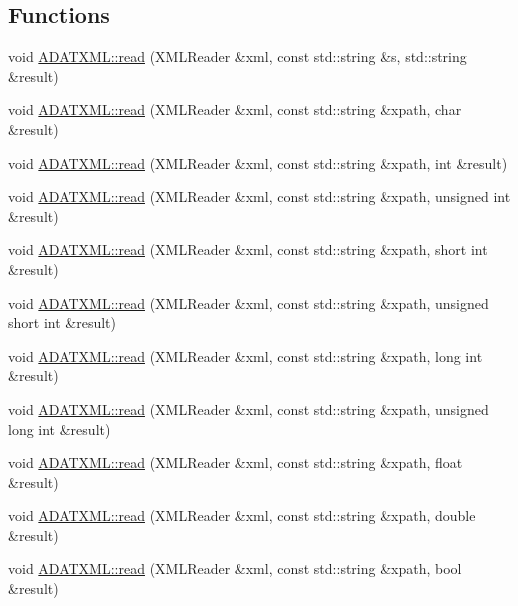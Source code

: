 \subsection*{Functions}
\begin{DoxyCompactItemize}
\item 
void \mbox{\hyperlink{group__io_ga9ad99522897be390bf165bf7f963acc8}{A\+D\+A\+T\+X\+M\+L\+::read}} (X\+M\+L\+Reader \&xml, const std\+::string \&s, std\+::string \&result)
\item 
void \mbox{\hyperlink{group__io_ga42921d40fdc242e0dc6200a66c1eb928}{A\+D\+A\+T\+X\+M\+L\+::read}} (X\+M\+L\+Reader \&xml, const std\+::string \&xpath, char \&result)
\item 
void \mbox{\hyperlink{group__io_ga0e33dbc1e3ebc33bfb45ef5f1b390e45}{A\+D\+A\+T\+X\+M\+L\+::read}} (X\+M\+L\+Reader \&xml, const std\+::string \&xpath, int \&result)
\item 
void \mbox{\hyperlink{group__io_ga8237b5b121cf20d4d72ebe0396ad5fc7}{A\+D\+A\+T\+X\+M\+L\+::read}} (X\+M\+L\+Reader \&xml, const std\+::string \&xpath, unsigned int \&result)
\item 
void \mbox{\hyperlink{group__io_gac393d0005e4174339c4abaf8a008deac}{A\+D\+A\+T\+X\+M\+L\+::read}} (X\+M\+L\+Reader \&xml, const std\+::string \&xpath, short int \&result)
\item 
void \mbox{\hyperlink{group__io_ga8fe4b50be5b1bd3e2bfb094b7c158c06}{A\+D\+A\+T\+X\+M\+L\+::read}} (X\+M\+L\+Reader \&xml, const std\+::string \&xpath, unsigned short int \&result)
\item 
void \mbox{\hyperlink{group__io_gac5101b8a4f533a23a99e6ae250648a1d}{A\+D\+A\+T\+X\+M\+L\+::read}} (X\+M\+L\+Reader \&xml, const std\+::string \&xpath, long int \&result)
\item 
void \mbox{\hyperlink{group__io_ga91e3d97bb48b2257dba32262f49d5758}{A\+D\+A\+T\+X\+M\+L\+::read}} (X\+M\+L\+Reader \&xml, const std\+::string \&xpath, unsigned long int \&result)
\item 
void \mbox{\hyperlink{group__io_ga1a88a7d3e3dbac33c732e580f8c23302}{A\+D\+A\+T\+X\+M\+L\+::read}} (X\+M\+L\+Reader \&xml, const std\+::string \&xpath, float \&result)
\item 
void \mbox{\hyperlink{group__io_ga75127d89932656a5224dd747b14ca897}{A\+D\+A\+T\+X\+M\+L\+::read}} (X\+M\+L\+Reader \&xml, const std\+::string \&xpath, double \&result)
\item 
void \mbox{\hyperlink{group__io_ga9309cae5bd0340cc4ed71055808b6fac}{A\+D\+A\+T\+X\+M\+L\+::read}} (X\+M\+L\+Reader \&xml, const std\+::string \&xpath, bool \&result)

\end{DoxyCompactItemize}
